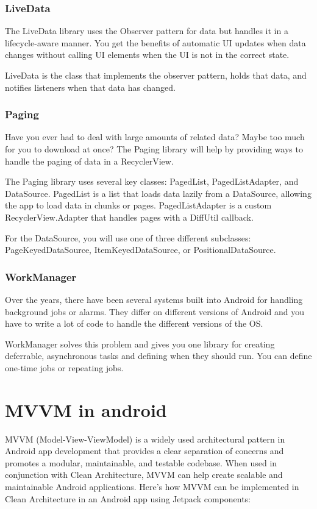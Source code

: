 \documentclass[a4paper, 12pt]{article}
\begin{document}
\subsubsection{LiveData}
The LiveData library uses the Observer pattern for data but handles it in a lifecycle-aware manner. You get the benefits of automatic UI updates when data changes without calling UI elements when the UI is not in the correct state.

LiveData is the class that implements the observer pattern, holds that data, and notifies listeners when that data has changed.
\subsubsection{Paging}
Have you ever had to deal with large amounts of related data? Maybe too much for you to download at once? The Paging library will help by providing ways to handle the paging of data in a RecyclerView.

The Paging library uses several key classes: PagedList, PagedListAdapter, and DataSource. PagedList is a list that loads data lazily from a DataSource, allowing the app to load data in chunks or pages. PagedListAdapter is a custom RecyclerView.Adapter that handles pages with a DiffUtil callback.

For the DataSource, you will use one of three different subclasses: PageKeyedDataSource, ItemKeyedDataSource, or PositionalDataSource.
\subsubsection{WorkManager}
Over the years, there have been several systems built into Android for handling background jobs or alarms. They differ on different versions of Android and you have to write a lot of code to handle the different versions of the OS.

WorkManager solves this problem and gives you one library for creating deferrable, asynchronous tasks and defining when they should run. You can define one-time jobs or repeating jobs.




\section{MVVM in android}

MVVM (Model-View-ViewModel) is a widely used architectural pattern in Android app development that provides a clear separation of concerns and promotes a modular, maintainable, and testable codebase. 
When used in conjunction with Clean Architecture, MVVM can help create scalable and maintainable Android applications. 
Here's how MVVM can be implemented in Clean Architecture in an Android app using Jetpack components:
\end{document}
